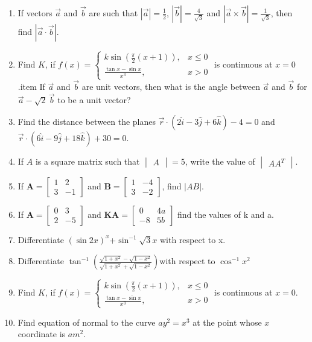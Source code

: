\documentclass[12pt,-letter paper]{article}
\let\vec\mathbf{}
\let\vec\mathbf{}
\let\vec\mathbf{}
\providecommand{\mydet}[1]{\ensuremath{\begin{vmatrix}#1\end{vmatrix}}}
\providecommand{\myvec}[1]{\ensuremath{\begin{bmatrix}#1\end{bmatrix}}}
\providecommand{\brak}[1]{\ensuremath{\left(#1\right)}}
\begin{document}
\begin{enumerate}
\item If vectors $\overrightarrow{a}$ and $\overrightarrow{b}$ are such that $|\overrightarrow{a}| = \frac{1}{2}$, $|\overrightarrow{b}| = \frac{4}{\sqrt{3}}$ and $|\overrightarrow{a} \times \overrightarrow{b}| = \frac{1}{\sqrt{3}}$, then find $|\overrightarrow{a} \cdot \overrightarrow{b}|$.

\item Find $K$, if $f(x) = \begin{cases}
 k \sin\left(\frac{\pi}{2}(x+1)\right), & x \leq 0 \\
\frac{\tan{x} - \sin{x}}{x^3}, & x > 0                         \end{cases}$ is continuous at $x = 0$.item If $\overrightarrow{a}$ and $\overrightarrow{b}$ are unit vectors, then what is the angle between $\overrightarrow{a}$ and $\overrightarrow{b}$ for $\overrightarrow{a} - \sqrt{2} \, \overrightarrow{b}$ to be a unit vector? 
\item Find the distance between the planes $ \overrightarrow{r} \cdot (2\hat{i} - 3\hat{j} + 6\hat{k}) - 4 = 0$ and $ \overrightarrow{r} \cdot (6\hat{i} - 9\hat{j} + 18\hat{k}) + 30 = 0.$
\item If $ A $ is a square matrix such that $\mydet{A} = 5 $, write the value of $\mydet{AA^T} $.
\item If $\vec{A}=\myvec{1 & 2 \\ 3 & -1}$ and  $\vec{B} = \myvec {1 & -4 \\ 3 & -2 }$, find $|AB|$.	
\item If $\vec{A}=\myvec{0 & 3 \\ 2 & -5}$ and $\vec{KA}=\myvec{0 & 4a \\ -8 & 5b }$ find the values of k and a.	
\item Differentiate $(\sin{2x})^x$+$\sin^{-1}\sqrt3x$ with respect to x. 
\item Differentiate $\tan^{-1}{\brak{\frac{\sqrt{1+x^2}-\sqrt{1-x^2}}{\sqrt{1+x^2}+\sqrt{1-x^2}}} }$with respect to $\cos^{-1}{x^2}$
\item Find $K$, if $f(x) = \begin{cases} 
k \sin\left(\frac{\pi}{2}(x+1)\right), & x \leq 0 \\
	\frac{\tan{x} - \sin{x}}{x^3}, & x > 0 
\end{cases}$ is continuous at $x = 0$.
\item Find equation of normal to the curve $ay^2=x^3$ at the point whose $x$ coordinate is $am^2$.

\end{enumerate}
\end{document}
